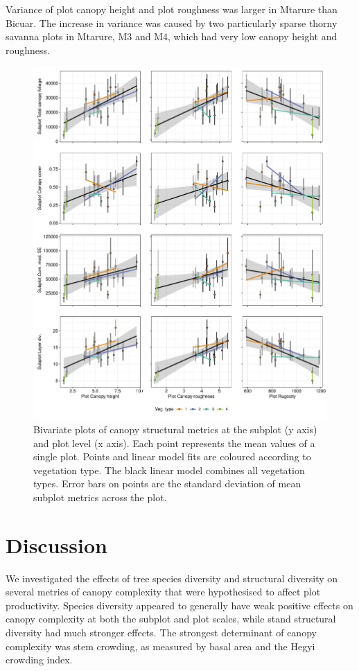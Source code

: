 \documentclass[11pt,a4paper]{article}
\begin{document}
Variance of plot canopy height and plot roughness was larger in Mtarure than Bicuar. The increase in variance was caused by two particularly sparse thorny savanna plots in Mtarure, M3 and M4, which had very low canopy height and roughness.


\begin{figure}
	\includegraphics[width=\textwidth]{plot_subplot_bivar}
	\caption{Bivariate plots of canopy structural metrics at the subplot (y axis) and plot level (x axis). Each point represents the mean values of a single plot. Points and linear model fits are coloured according to vegetation type. The black linear model combines all vegetation types. Error bars on points are the standard deviation of mean subplot metrics across the plot.}
	\label{plot_subplot_bivar}
\end{figure}



\section{Discussion}

We investigated the effects of tree species diversity and structural diversity on several metrics of canopy complexity that were hypothesised to affect plot productivity. Species diversity appeared to generally have weak positive effects on canopy complexity at both the subplot and plot scales, while stand structural diversity had much stronger effects. The strongest determinant of canopy complexity was stem crowding, as measured by basal area and the Hegyi crowding index.
\end{document}
